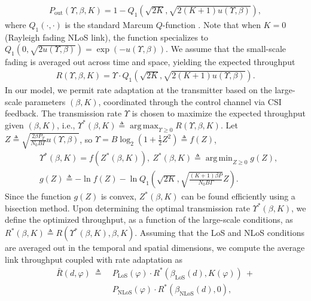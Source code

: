 \documentclass[10pt,twocolumn]{IEEEtran}
\DeclareMathOperator*{\argmax}{arg\,max}
\DeclareMathOperator*{\argmin}{arg\,min}
\begin{document}
\begin{align}
	P_{\mathrm{out}}(\Upsilon,\beta,K)=1-Q_{1}\left(\sqrt{2K},\sqrt{2(K+1)u(\Upsilon,\beta)}\right),
\end{align}
where $Q_{1}(\cdot,\cdot)$ is the standard Marcum $Q$-function \cite{Rician}. Note that when $K{=}0$ (Rayleigh fading NLoS link), the function specializes to $Q_{1}\left(0,\sqrt{2u(\Upsilon,\beta)}\right){=}\exp(-u(\Upsilon,\beta))$. We assume that the small-scale fading is averaged out across time and space, yielding the expected throughput
\begin{align}
	R(\Upsilon,\beta,K)=\Upsilon\cdot Q_{1}\left(\sqrt{2K},\sqrt{2(K+1)u(\Upsilon,\beta)}\right).
\end{align}
In our model, we permit rate adaptation at the transmitter based on the large-scale parameters $(\beta,K)$, coordinated through the control channel via CSI feedback. The transmission rate $\Upsilon$ is chosen to maximize the expected throughput given $(\beta,K)$, i.e., $\Upsilon^{*}(\beta,K){\triangleq}\argmax_{\Upsilon{\geq}0}R(\Upsilon,\beta,K)$. Let $Z{\triangleq}\sqrt{\frac{2{\beta}P_{T}}{N_{0}B\Gamma}u(\Upsilon,\beta)}$, so $\Upsilon{=}B\log_{2}\left(1{+}\frac{1}{2}Z^{2}\right){\triangleq}f(Z)$,
\begin{align}
    &\Upsilon^{*}(\beta,K){=}f(Z^{*}(\beta,K)),\ Z^{*}(\beta,K){\triangleq}\argmin_{Z{\geq}0}g(Z),\nonumber\\
    &g(Z){\triangleq}-\ln f(Z){-}\ln Q_{1}\left(\sqrt{2K},\sqrt{\frac{(K{+}1)\beta P}{N_{0}B\Gamma}}Z\right).
\end{align}
Since the function $g(Z)$ is convex, $Z^{*}(\beta,K)$ can be found efficiently using a bisection method. Upon determining the optimal transmission rate $\Upsilon^{*}(\beta,K)$, we define the optimized throughput, as a function of the large-scale conditions, as $R^{*}(\beta,K) \triangleq R(\Upsilon^{*}(\beta,K),\beta,K)$. Assuming that the LoS and NLoS conditions are averaged out in the temporal and spatial dimensions, we compute the average link throughput coupled with rate adaptation as
\begin{align}\label{TBar}
	\bar{R}(d,\varphi)\ \triangleq\ &P_{\mathrm{LoS}}(\varphi)\cdot R^{*}(\beta_{\mathrm{LoS}}(d),K(\varphi))\ +\nonumber\\
	&P_{\mathrm{NLoS}}(\varphi)\cdot R^{*}(\beta_{\mathrm{NLoS}}(d),0),
\end{align}
\end{document}
